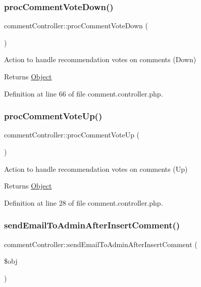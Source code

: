 \subsubsection{\texorpdfstring{proc\+Comment\+Vote\+Down()}{procCommentVoteDown()}}
{\footnotesize\ttfamily comment\+Controller\+::proc\+Comment\+Vote\+Down (\begin{DoxyParamCaption}{ }\end{DoxyParamCaption})}

Action to handle recommendation votes on comments (Down) \begin{DoxyReturn}{Returns}
\hyperlink{classObject}{Object} 
\end{DoxyReturn}


Definition at line 66 of file comment.\+controller.\+php.

\mbox{\label{classcommentController_a1ca216be683b8cedf6b5f71aaa23a0b3}} 
\subsubsection{\texorpdfstring{proc\+Comment\+Vote\+Up()}{procCommentVoteUp()}}
{\footnotesize\ttfamily comment\+Controller\+::proc\+Comment\+Vote\+Up (\begin{DoxyParamCaption}{ }\end{DoxyParamCaption})}

Action to handle recommendation votes on comments (Up) \begin{DoxyReturn}{Returns}
\hyperlink{classObject}{Object} 
\end{DoxyReturn}


Definition at line 28 of file comment.\+controller.\+php.

\mbox{\label{classcommentController_a36736562b092a021301ec11a61310e68}} 
\subsubsection{\texorpdfstring{send\+Email\+To\+Admin\+After\+Insert\+Comment()}{sendEmailToAdminAfterInsertComment()}}
{\footnotesize\ttfamily comment\+Controller\+::send\+Email\+To\+Admin\+After\+Insert\+Comment (\begin{DoxyParamCaption}\item[{}]{\$obj }\end{DoxyParamCaption})}

